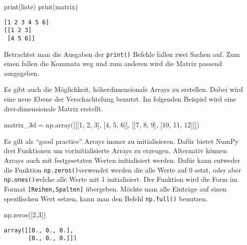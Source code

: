 \documentclass[
  letterpaper,
  DIV=11,
  numbers=noendperiod]{scrreprt}
\newenvironment{Shaded}{\begin{snugshade}}{\end{snugshade}}
\newcommand{\BuiltInTok}[1]{\textcolor[rgb]{0.00,0.23,0.31}{#1}}
\newcommand{\DecValTok}[1]{\textcolor[rgb]{0.68,0.00,0.00}{#1}}
\newcommand{\NormalTok}[1]{\textcolor[rgb]{0.00,0.23,0.31}{#1}}
\newcommand{\OperatorTok}[1]{\textcolor[rgb]{0.37,0.37,0.37}{#1}}
\begin{document}
\begin{tcolorbox}
\begin{Shaded}
\begin{Highlighting}[]
\BuiltInTok{print}\NormalTok{(liste)}
\BuiltInTok{print}\NormalTok{(matrix)}
\end{Highlighting}
\end{Shaded}

\begin{verbatim}
[1 2 3 4 5 6]
[[1 2 3]
 [4 5 6]]
\end{verbatim}

Betrachtet man die Ausgaben der \texttt{print()} Befehle fallen zwei
Sachen auf. Zum einen fallen die Kommata weg und zum anderen wird die
Matrix passend ausgegeben.

Es gibt auch die Möglichkeit, höherdimensionale Arrays zu erstellen.
Dabei wird eine neue Ebene der Verschachtelung benutzt. Im folgenden
Beispiel wird eine drei-dimensionale Matrix erstellt.

\begin{Shaded}
\begin{Highlighting}[]
\NormalTok{matrix\_3d }\OperatorTok{=}\NormalTok{ np.array([[[}\DecValTok{1}\NormalTok{, }\DecValTok{2}\NormalTok{, }\DecValTok{3}\NormalTok{], [}\DecValTok{4}\NormalTok{, }\DecValTok{5}\NormalTok{, }\DecValTok{6}\NormalTok{]], [[}\DecValTok{7}\NormalTok{, }\DecValTok{8}\NormalTok{, }\DecValTok{9}\NormalTok{], [}\DecValTok{10}\NormalTok{, }\DecValTok{11}\NormalTok{, }\DecValTok{12}\NormalTok{]]])}
\end{Highlighting}
\end{Shaded}

Es gilt als ``good practice'' Arrays immer zu initialisieren. Dafür
bietet NumPy drei Funktionen um vorinitialisierte Arrays zu erzeugen.
Alternativ können Arrays auch mit festgesetzten Werten initialisiert
werden. Dafür kann entweder die Funktion \texttt{np.zeros()}verwendet
werden die alle Werte auf 0 setzt, oder aber \texttt{np.ones()}welche
alle Werte mit 1 initialisiert. Der Funktion wird die Form im Format
\texttt{{[}Reihen,Spalten{]}} übergeben. Möchte man alle Einträge auf
einen spezifischen Wert setzen, kann man den Befehl \texttt{np.full()}
benutzen.

\begin{Shaded}
\begin{Highlighting}[]
\NormalTok{np.zeros([}\DecValTok{2}\NormalTok{,}\DecValTok{3}\NormalTok{])}
\end{Highlighting}
\end{Shaded}

\begin{verbatim}
array([[0., 0., 0.],
       [0., 0., 0.]])
\end{verbatim}


\end{tcolorbox}
\end{document}
